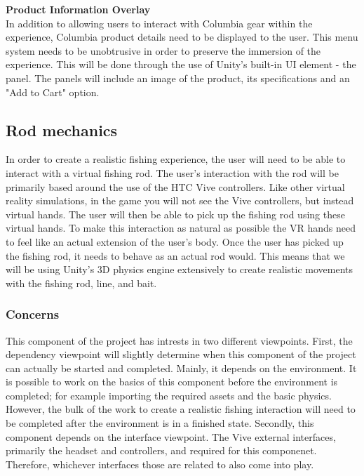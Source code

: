\documentclass[10pt,journal,compsoc,onecolumn, draftclsnofoot]{IEEEtran}
\begin{document}
\hangindent=0.5cm \textbf{Product Information Overlay} \\

In addition to allowing users to interact with Columbia gear within the experience, Columbia product details need to be displayed to the user. This menu system needs to be unobtrusive in order to preserve the immersion of the experience. This will be done through the use of Unity's built-in UI element - the panel. The panels will include an image of the product, its specifications and an "Add to Cart" option. \\

\subsection{Rod mechanics}
In order to create a realistic fishing experience, the user will need to be able to interact with a virtual fishing rod.
The user's interaction with the rod will be primarily based around the use of the HTC Vive controllers.
Like other virtual reality simulations, in the game you will not see the Vive controllers, but instead virtual hands.
The user will then be able to pick up the fishing rod using these virtual hands.
To make this interaction as natural as possible the VR hands need to feel like an actual extension of the user's body.
Once the user has picked up the fishing rod, it needs to behave as an actual rod would.
This means that we will be using Unity's 3D physics engine extensively to create realistic movements with the fishing rod, line, and bait.

\subsubsection{Concerns}
This component of the project has intrests in two different viewpoints.
First, the dependency viewpoint will slightly determine when this component of the project can actually be started and completed.
Mainly, it depends on the environment.
It is possible to work on the basics of this component before the environment is completed; for example importing the required assets and the basic physics.
However, the bulk of the work to create a realistic fishing interaction will need to be completed after the environment is in a finished state.
Secondly, this component depends on the interface viewpoint.
The Vive external interfaces, primarily the headset and controllers, and required for this componenet.
Therefore, whichever interfaces those are related to also come into play.
\end{document}
